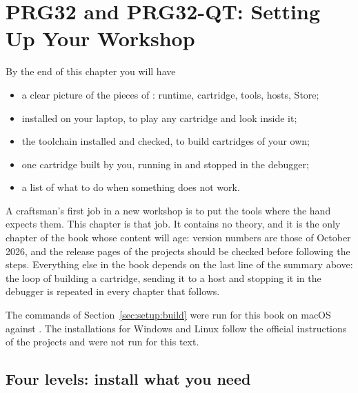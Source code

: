 \chapter{PRG32 and PRG32-QT: Setting Up Your Workshop}
\label{ch:setup}


\begin{chapgoals}
By the end of this chapter you will have
\begin{itemize}
\item a clear picture of the pieces of \prg: runtime, cartridge, tools, hosts, Store;
\item \prgqt installed on your laptop, to play any cartridge and look inside it;
\item the \riscv toolchain installed and checked, to build cartridges of your own;
\item one cartridge built by you, running in \prgqt and stopped in the debugger;
\item a list of what to do when something does not work.
\end{itemize}
\end{chapgoals}


A craftsman's first job in a new workshop is to put the tools where the hand
expects them. This chapter is that job. It contains no theory, and it is the
only chapter of the book whose content will age: version numbers are those of
October 2026, and the release pages of the projects should be checked before
following the steps. Everything else in the book depends on the last line of
the summary above: the loop of building a cartridge, sending it to a host and
stopping it in the debugger is repeated in every chapter that follows.

The commands of Section~\ref{sec:setup:build} were run for this book on macOS
against \prgqt. The installations for Windows and Linux follow the official
instructions of the projects and were not run for this text.

\section{Four levels: install what you need}

